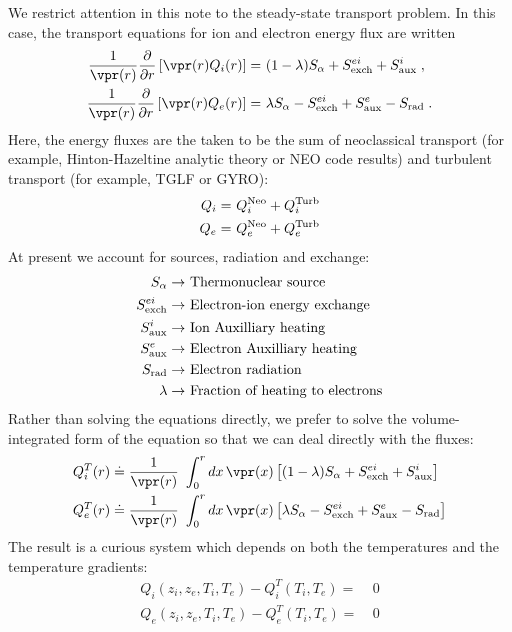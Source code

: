 We restrict attention in this note to the steady-state transport 
problem.  In this case, the transport equations for ion and 
electron energy flux are written
%
\begin{align}
\frac{1}{\vpr(r)} \frac{\partial}{\partial r} \left[ 
\vpr(r) Q_i(r) \right] = &~(1-\lambda) S_\alpha + S_{\rm exch}^{ei} 
  + S_{\rm aux}^i \; , \\ 
\frac{1}{\vpr(r)} \frac{\partial}{\partial r} \left[ 
\vpr(r) Q_e(r) \right] = &~\lambda S_\alpha - S_{\rm exch}^{ei} 
 + S_{\rm aux}^e - S_{\rm rad} \; . 
\end{align}
%
Here, the energy fluxes are the taken to be the sum of neoclassical 
transport (for example, Hinton-Hazeltine analytic theory or NEO code 
results) and turbulent transport (for example, TGLF or GYRO):
%
\begin{align}
Q_i = & ~Q_i^{\rm Neo} + Q_i^{\rm Turb} \\ 
Q_e = & ~Q_e^{\rm Neo} + Q_e^{\rm Turb} 
\end{align}
%
At present we account for sources, radiation and exchange:
%
\begin{align*}
S_\alpha \rightarrow &~\text{Thermonuclear source} \\
S_{\rm exch}^{ei} \rightarrow &~\text{Electron-ion energy exchange} \\
S_{\rm aux}^i \rightarrow &~\text{Ion Auxilliary heating} \\
S_{\rm aux}^e \rightarrow &~\text{Electron Auxilliary heating} \\
S_{\rm rad} \rightarrow &~\text{Electron radiation} \\
\lambda \rightarrow &~\text{Fraction of heating to electrons}
\end{align*}
% 
Rather than solving the equations directly, we prefer to solve 
the volume-integrated form of the equation so that we can 
deal directly with the fluxes:
%
\begin{align}
Q_i^T(r) \doteq \frac{1}{\vpr(r)} & ~\int_0^r dx \, \vpr(x) \left[
  (1-\lambda) S_\alpha + S_{\rm exch}^{ei} + S_{\rm aux}^i \right] \\ 
Q_e^T(r) \doteq \frac{1}{\vpr(r)} & ~\int_0^r dx \, \vpr(x) \left[ 
  \lambda S_\alpha - S_{\rm exch}^{ei} + S_{\rm aux}^e - S_{\rm rad} \right]  
\end{align}
%
The result is a curious system which depends on both the temperatures 
and the temperature gradients:
%
\begin{align}
Q_i(z_i,z_e,T_i,T_e) - Q_i^T(T_i,T_e) = &~0 \\
Q_e(z_i,z_e,T_i,T_e) - Q_e^T(T_i,T_e) = &~0
\end{align}
